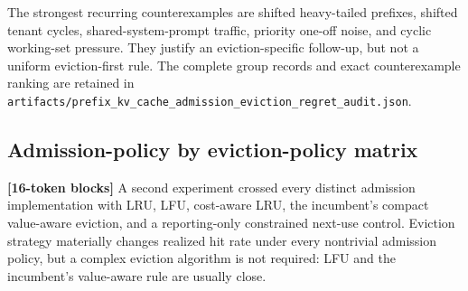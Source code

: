 \documentclass[11pt]{article}
\newcommand{\filepath}[1]{\nolinkurl{#1}}
\newcommand{\blocktag}[1]{\textbf{\color{navy}[#1-token blocks]}}
\begin{document}
The strongest recurring counterexamples are shifted heavy-tailed prefixes, shifted
tenant cycles, shared-system-prompt traffic, priority one-off noise, and cyclic
working-set pressure.  They justify an eviction-specific follow-up, but not a uniform
eviction-first rule.  The complete group records and exact counterexample ranking are
retained in
\filepath{artifacts/prefix_kv_cache_admission_eviction_regret_audit.json}.

\subsection{Admission-policy by eviction-policy matrix}

\blocktag{16} A second experiment crossed every distinct admission implementation with
LRU, LFU, cost-aware LRU, the incumbent's compact value-aware eviction, and a
reporting-only constrained next-use control.  Eviction strategy materially changes
realized hit rate under every nontrivial admission policy, but a complex eviction
algorithm is not required: LFU and the incumbent's value-aware rule are usually close.

\begin{table}[H]
\centering
\small
{}
\caption{Best eviction rule for each admission implementation.}
\label{tab:admission-eviction-matrix}
\end{table}
\end{document}
